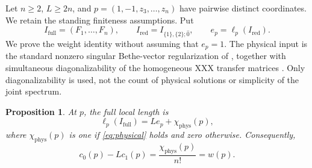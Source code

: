 \documentclass[11pt]{article}
\newtheorem{proposition}{Proposition}[section]
\theoremstyle{definition}
\begin{document}
Let $n\ge2$, $L\ge2n$, and
$p=(1,-1,z_3,\ldots,z_n)$ have pairwise distinct coordinates.
We retain the standing finiteness assumptions. Put
\[
 I_{\mathrm{full}}=(F_1,\ldots,F_n),\qquad
 I_{\mathrm{red}}=I_{\{1\},\{2\};\hat0},\qquad
 e_p=\ell_p(I_{\mathrm{red}}).
\]
We prove the weight identity without assuming that $e_p=1$.
The physical input is the standard nonzero singular Bethe-vector
regularization of \cite[Section~3]{NW2013}, together with simultaneous
diagonalizability of the homogeneous XXX transfer matrices
\cite[Theorem~12.6.1]{MTV2009}. Only diagonalizability is used, not the
count of physical solutions or simplicity of the joint spectrum.

\begin{proposition}\label{prop:one-pair-weight}
At $p$, the full local length is
\begin{equation}\label{eq:one-pair-general-length}
 \ell_p(I_{\mathrm{full}})=Le_p+\chi_{\mathrm{phys}}(p),
\end{equation}
where $\chi_{\mathrm{phys}}(p)$ is one if
\eqref{eq:physical} holds and zero otherwise. Consequently,
\[
 \boxed{c_0(p)-Lc_1(p)=\frac{\chi_{\mathrm{phys}}(p)}{n!}=w(p).}
\]
\end{proposition}
\end{document}

